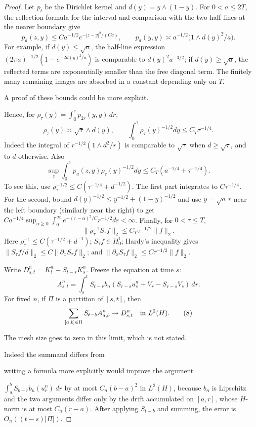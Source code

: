 \documentclass[12pt]{article}
\newcommand{\1}{\mathbf 1}
\newcommand{\review}[1]{\begin{reviewbox}#1\end{reviewbox}}
\begin{document}
\begin{proof}
Let \(p_t\) be the Dirichlet kernel and \(d(y)=y\wedge(1-y)\).  For
\(0<a\le 2T\), the reflection formula for the interval and comparison with
the two half-lines at the nearer boundary give
\[
p_a(z,y)\le Ca^{-1/2}e^{-|z-y|^2/(Ca)},\qquad
p_a(y,y)\asymp a^{-1/2}\bigl(1\wedge d(y)^2/a\bigr).          \tag{3}
\]
For example, if \(d(y)\le\sqrt a\), the half-line expression
\((2\pi a)^{-1/2}(1-e^{-2d(y)^2/a})\) is comparable to \(d(y)^2a^{-3/2}\);
if \(d(y)\ge\sqrt a\), the reflected terms are exponentially smaller than
the free diagonal term.  The finitely many remaining images are absorbed in a
constant depending only on \(T\). \review{A proof of these bounds could be more explicit.}  Hence, for
\(\rho_\tau(y)=\int_0^\tau p_{2r}(y,y)\,dr\),
\[
        \rho_\tau(y)\asymp \sqrt{\tau}\wedge d(y),\qquad
        \int_0^1\rho_\tau(y)^{-1/2}dy\le C_T\tau^{-1/4}.      \tag{4}
\]
Indeed the integral of \(r^{-1/2}(1\wedge d^2/r)\) is comparable to
\(\sqrt\tau\) when \(d\ge\sqrt\tau\), and to \(d\) otherwise.  Also
\[
 \sup_z\int_0^1p_a(z,y)\rho_\tau(y)^{-1/2}dy
 \le C_T(a^{-1/4}+\tau^{-1/4}).                              \tag{5}
\]
To see this, use \(\rho_\tau^{-1/2}\le C(\tau^{-1/4}+d^{-1/2})\).  The first
part integrates to \(C\tau^{-1/4}\).  For the second, bound
\(d(y)^{-1/2}\le y^{-1/2}+(1-y)^{-1/2}\) and use
\(y=\sqrt a\,r\) near the left boundary (similarly near the right) to get
\(Ca^{-1/4}\sup_{\alpha\ge0}\int_0^\infty
e^{-(r-\alpha)^2/C}r^{-1/2}dr<\infty\).  Finally, for \(0<\tau\le T\),
\[
        \|\rho_\tau^{-1}S_\tau f\|_2\le C_T\tau^{-1/2}\|f\|_2. \tag{6}
\]
Here \(\rho_\tau^{-1}\le C(\tau^{-1/2}+d^{-1})\); \(S_\tau f\in H^1_0\);
Hardy's inequality gives \(\|S_\tau f/d\|_2\le C\|\partial_xS_\tau f\|_2\);
and \(\|\partial_xS_\tau f\|_2\le C\tau^{-1/2}\|f\|_2\).

Write \(D^n_{s,t}=K_t^n-S_{t-s}K_s^n\).  Freeze the equation at time \(s\):
\[
 A^n_{s,t}=\int_s^tS_{t-r}
 b_n\!\left(S_{r-s}u_s^n+V_r-S_{r-s}V_s\right)\,dr .          \tag{7}
\]
For fixed \(n\), if \(\Pi\) is a partition of \([s,t]\), then
\[
 \sum_{[a,b]\in\Pi}S_{t-b}A^n_{a,b}\to D^n_{s,t}\quad\hbox{in }L^2(H).
 \tag{8}
\]
\review{The mesh size goes to zero in this limit, which is not stated.}
Indeed the summand differs from \review{writing a formula more explicitly would improve the argument}
\(\int_a^bS_{b-r}b_n(u_r^n)\,dr\) by at most
\(C_n(b-a)^2\) in \(L^2(H)\), because \(b_n\) is Lipschitz and the two
arguments differ only by the drift accumulated on \([a,r]\), whose \(H\)-norm
is at most \(C_n(r-a)\).  After applying \(S_{t-b}\) and summing, the error is
\(O_n((t-s)|\Pi|)\).


\end{proof}
\end{document}
